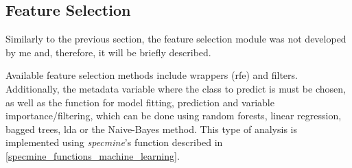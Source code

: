 


\subsection{Feature Selection}

Similarly to the previous section, the feature selection module was not developed by me and, therefore, it will be briefly described.

Available feature selection methods include wrappers (\gls{rfe}) and filters. Additionally, the metadata variable where the class to predict is must be chosen, as well as the function for model fitting, prediction and variable importance/filtering, which can be done using random forests, linear regression, bagged trees, \gls{lda} or the Naive-Bayes method. This type of analysis is implemented using \textit{specmine}'s function described in \autoref{specmine_functions_machine_learning}.









